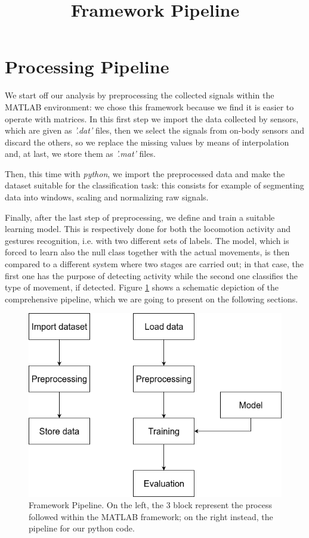 
\section{Processing Pipeline}
\label{sec:processing_architecture}

We start off our analysis by preprocessing the collected signals within the MATLAB environment: we chose this framework because we find it is easier to operate with matrices. In this first step we import the data collected by sensors, which are given as \textit{'.dat'} files, then we select the signals from on-body sensors and discard the others, so we replace the missing values by means of interpolation and, at last, we store them as \textit{'.mat'} files.

Then, this time with \textit{python}, we import the preprocessed data and make the dataset suitable for the classification task: this consists for example of segmenting data into windows, scaling and normalizing raw signals.

Finally, after the last step of preprocessing, we define and train a suitable learning model. This is respectively done for both the locomotion activity and gestures recognition, i.e. with two different sets of labels. The model, which is forced to learn also the null class together with the actual movements, is then compared to a different system where two stages are carried out; in that case, the first one has the purpose of detecting activity while the second one classifies the type of movement, if detected. Figure \ref{fig:pipeline} shows a schematic depiction of the comprehensive pipeline, which we are going to present on the following sections.

\begin{figure}[ht]
	\centering
	\includegraphics[scale=.4]{figure/block_diag}
	\title{Framework Pipeline}
	\caption{Framework Pipeline. On the left, the 3 block represent the process followed within the MATLAB framework; on the right instead, the pipeline for our python code.}
	\label{fig:pipeline}
\end{figure}

